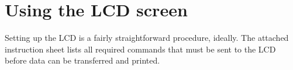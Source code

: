 \section{Using the LCD screen}

Setting up the LCD is a fairly straightforward procedure, ideally. The attached instruction sheet lists all required commands that must be sent to the LCD before data can be transferred and printed. 


